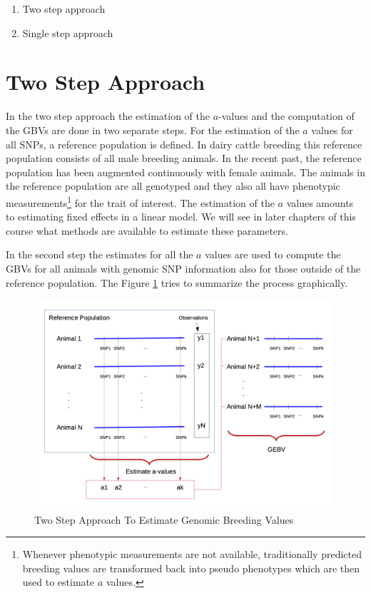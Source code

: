 \documentclass[
]{book}
\providecommand{\tightlist}{%
  \setlength{\itemsep}{0pt}\setlength{\parskip}{0pt}}
\theoremstyle{definition}
\theoremstyle{definition}
\theoremstyle{definition}
\theoremstyle{remark}
\begin{document}
\begin{enumerate}
\def\labelenumi{\arabic{enumi}.}
\tightlist
\item
  Two step approach
\item
  Single step approach
\end{enumerate}

\hypertarget{asm-two-step-approach}{%
\section{Two Step Approach}\label{asm-two-step-approach}}

In the two step approach the estimation of the \(a\)-values and the computation of the GBVs are done in two separate steps. For the estimation of the \(a\) values for all SNPs, a reference population is defined. In dairy cattle breeding this reference population consists of all male breeding animals. In the recent past, the reference population has been augmented continuously with female animals. The animals in the reference population are all genotyped and they also all have phenotypic measurements\footnote{Whenever phenotypic measurements are not available, traditionally predicted breeding values are transformed back into pseudo phenotypes which are then used to estimate \(a\) values.} for the trait of interest. The estimation of the \(a\) values amounts to estimating fixed effects in a linear model. We will see in later chapters of this course what methods are available to estimate these parameters.

In the second step the estimates for all the \(a\) values are used to compute the GBVs for all animals with genomic SNP information also for those outside of the reference population. The Figure \ref{fig:twostepgs} tries to summarize the process graphically.

\begin{figure}
\includegraphics[width=11cm]{odg/twostepgs} \caption{Two Step Approach To Estimate Genomic Breeding Values}\label{fig:twostepgs}
\end{figure}
\end{document}
